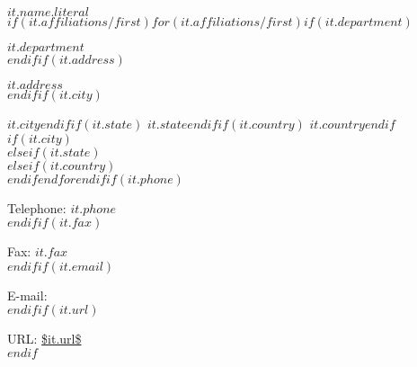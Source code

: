 $it.name.literal$\\$if(it.affiliations/first)$$for(it.affiliations/first)$$if(it.department)$

$it.department$\\$endif$$if(it.address)$

$it.address$\\$endif$$if(it.city)$

$it.city$$endif$$if(it.state)$ $it.state$$endif$$if(it.country)$ $it.country$$endif$$if(it.city)$\\$elseif(it.state)$\\$elseif(it.country)$\\$endif$$endfor$$endif$$if(it.phone)$

Telephone: $it.phone$\\$endif$$if(it.fax)$

Fax: $it.fax$\\$endif$$if(it.email)$

E-mail: \\$endif$$if(it.url)$

URL: \url{$it.url$}\\$endif$

\\~


